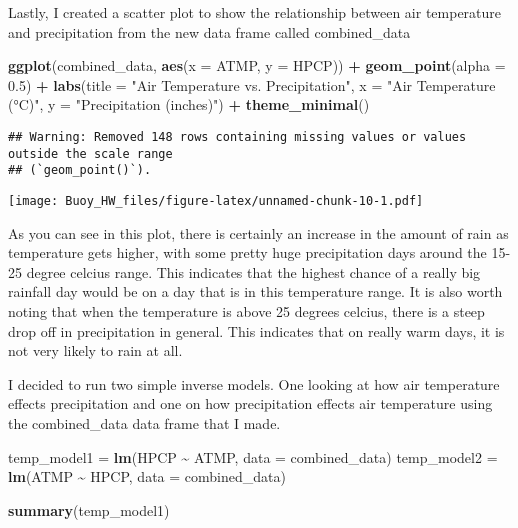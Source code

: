 \documentclass[
]{article}
\newenvironment{Shaded}{\begin{snugshade}}{\end{snugshade}}
\newcommand{\AttributeTok}[1]{\textcolor[rgb]{0.13,0.29,0.53}{#1}}
\newcommand{\FloatTok}[1]{\textcolor[rgb]{0.00,0.00,0.81}{#1}}
\newcommand{\FunctionTok}[1]{\textcolor[rgb]{0.13,0.29,0.53}{\textbf{#1}}}
\newcommand{\NormalTok}[1]{#1}
\newcommand{\OtherTok}[1]{\textcolor[rgb]{0.56,0.35,0.01}{#1}}
\newcommand{\SpecialCharTok}[1]{\textcolor[rgb]{0.81,0.36,0.00}{\textbf{#1}}}
\newcommand{\StringTok}[1]{\textcolor[rgb]{0.31,0.60,0.02}{#1}}
\begin{document}
Lastly, I created a scatter plot to show the relationship between air
temperature and precipitation from the new data frame called
combined\_data

\begin{Shaded}
\begin{Highlighting}[]
\FunctionTok{ggplot}\NormalTok{(combined\_data, }\FunctionTok{aes}\NormalTok{(}\AttributeTok{x =}\NormalTok{ ATMP, }\AttributeTok{y =}\NormalTok{ HPCP)) }\SpecialCharTok{+}
  \FunctionTok{geom\_point}\NormalTok{(}\AttributeTok{alpha =} \FloatTok{0.5}\NormalTok{) }\SpecialCharTok{+}
  \FunctionTok{labs}\NormalTok{(}\AttributeTok{title =} \StringTok{"Air Temperature vs. Precipitation"}\NormalTok{,}
       \AttributeTok{x =} \StringTok{"Air Temperature (°C)"}\NormalTok{,}
       \AttributeTok{y =} \StringTok{"Precipitation (inches)"}\NormalTok{) }\SpecialCharTok{+}
  \FunctionTok{theme\_minimal}\NormalTok{()}
\end{Highlighting}
\end{Shaded}

\begin{verbatim}
## Warning: Removed 148 rows containing missing values or values outside the scale range
## (`geom_point()`).
\end{verbatim}

\texttt{[image: Buoy\_HW\_files/figure-latex/unnamed-chunk-10-1.pdf]}

As you can see in this plot, there is certainly an increase in the
amount of rain as temperature gets higher, with some pretty huge
precipitation days around the 15-25 degree celcius range. This indicates
that the highest chance of a really big rainfall day would be on a day
that is in this temperature range. It is also worth noting that when the
temperature is above 25 degrees celcius, there is a steep drop off in
precipitation in general. This indicates that on really warm days, it is
not very likely to rain at all.

I decided to run two simple inverse models. One looking at how air
temperature effects precipitation and one on how precipitation effects
air temperature using the combined\_data data frame that I made.

\begin{Shaded}
\begin{Highlighting}[]
\NormalTok{temp\_model1 }\OtherTok{=} \FunctionTok{lm}\NormalTok{(HPCP }\SpecialCharTok{\textasciitilde{}}\NormalTok{ ATMP, }\AttributeTok{data =}\NormalTok{ combined\_data)}
\NormalTok{temp\_model2 }\OtherTok{=} \FunctionTok{lm}\NormalTok{(ATMP }\SpecialCharTok{\textasciitilde{}}\NormalTok{ HPCP, }\AttributeTok{data =}\NormalTok{ combined\_data)}

\FunctionTok{summary}\NormalTok{(temp\_model1)}
\end{Highlighting}
\end{Shaded}
\end{document}
